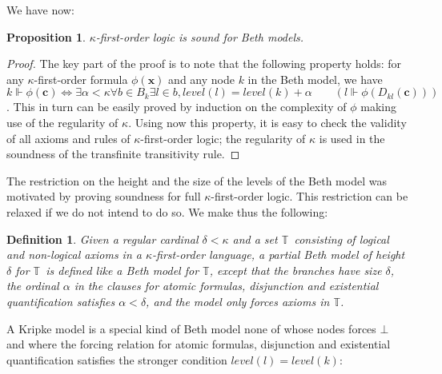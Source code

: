 \documentclass[a4paper,11pt]{article}
\theoremstyle{plain}
\newtheorem{proposition}[thm]{Proposition}
\theoremstyle{plain}
\newtheorem{defs}[thm]{Definition}
\theoremstyle{remark}
\newcommand{\theory}{\ensuremath{\mathbb{T}}}
\begin{document}
We have now:

\begin{proposition}  
$\kappa$-first-order logic is sound for Beth models.
\end{proposition}

\begin{proof}
The key part of the proof is to note that the following property holds: for any $\kappa$-first-order formula $\phi(\mathbf{x})$ and any node $k$ in the Beth model, we have $k \Vdash \phi(\mathbf{c}) \iff \exists \alpha<\kappa \forall b \in B_k \exists l \in b, level(l)=level(k)+\alpha \qquad (l \Vdash \phi(D_{kl}(\mathbf{c})))$. This in turn can be easily proved by induction on the complexity of $\phi$ making use of the regularity of $\kappa$. Using now this property, it is easy to check the validity of all axioms and rules of $\kappa$-first-order logic; the regularity of $\kappa$ is used in the soundness of the transfinite transitivity rule.
\end{proof}

The restriction on the height and the size of the levels of the Beth model was motivated by proving soundness for full $\kappa$-first-order logic. This restriction can be relaxed if we do not intend to do so. We make thus the following:

\begin{defs} 
Given a regular cardinal $\delta<\kappa$ and a set \theory\ consisting of logical and non-logical axioms in a $\kappa$-first-order language, a partial Beth model of height $\delta$ for \theory\ is defined like a Beth model for $\theory$, except that the branches have size $\delta$, the ordinal $\alpha$ in the clauses for atomic formulas, disjunction and existential quantification satisfies $\alpha<\delta$, and the model only forces axioms in $\theory$.
\end{defs}

A Kripke model is a special kind of Beth model none of whose nodes forces $\bot$ and where the forcing relation for atomic formulas, disjunction and existential quantification satisfies the stronger condition $level(l)=level(k)$:
\end{document}
